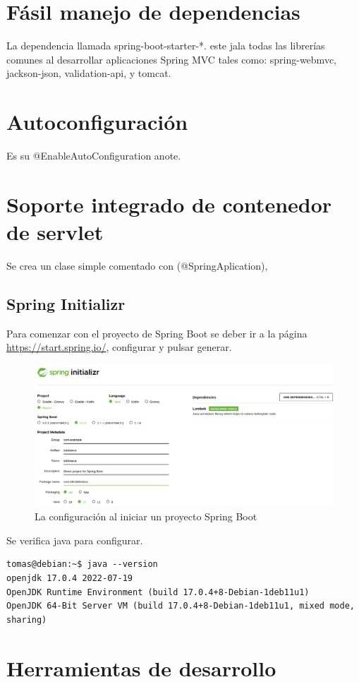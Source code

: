 \section{Fásil manejo de dependencias}
La dependencia llamada spring-boot-starter-*. este jala todas las librerías comunes al desarrollar aplicaciones Spring MVC tales como: spring-webmvc, jackson-json, validation-api, y tomcat. 
\section{Autoconfiguración}
Es su @EnableAutoConfiguration anote. 
\section{Soporte integrado de contenedor de servlet}
Se crea un clase simple comentado con (@SpringAplication), 

\subsection{Spring Initializr}
Para comenzar con el proyecto de Spring Boot se deber ir a la página \url{https://start.spring.io/}, configurar y pulsar generar. 
\begin{figure}[h]
\includegraphics[scale=0.5]{images/spring1}
\caption{La configuración al iniciar un proyecto Spring Boot}
\end{figure}
Se verifica java para configurar. 
\begin{verbatim}
tomas@debian:~$ java --version
openjdk 17.0.4 2022-07-19
OpenJDK Runtime Environment (build 17.0.4+8-Debian-1deb11u1)
OpenJDK 64-Bit Server VM (build 17.0.4+8-Debian-1deb11u1, mixed mode, sharing)
\end{verbatim}

\section{Herramientas de desarrollo}



